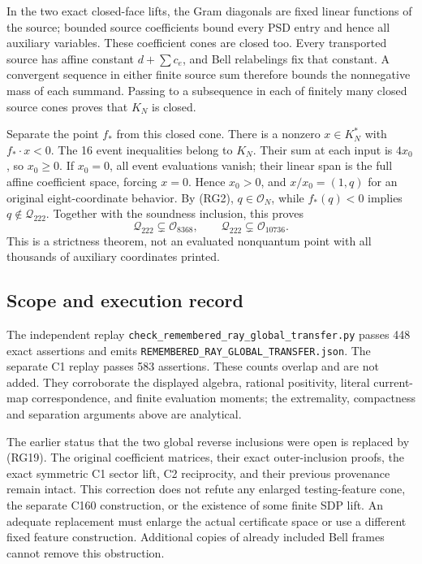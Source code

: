 In the two exact closed-face lifts, the Gram diagonals are fixed
linear functions of the source; bounded source coefficients bound
every PSD entry and hence all auxiliary variables.  These coefficient
cones are closed too.  Every transported source has affine constant
$d+\sum c_e$, and Bell relabelings fix that constant.  A convergent
sequence in either finite source sum therefore bounds the nonnegative
mass of each summand.  Passing to a subsequence in each of finitely
many closed source cones proves that $K_N$ is closed.

Separate the point $f_*$ from this closed cone.  There is a nonzero
$x\in K_N^*$ with $f_*\cdot x<0$.  The 16 event inequalities belong
to $K_N$.  Their sum at each input is $4x_0$, so $x_0\geq0$.
If $x_0=0$, all event evaluations vanish; their linear span is the
full affine coefficient space, forcing $x=0$.  Hence $x_0>0$, and
$x/x_0=(1,q)$ for an original eight-coordinate behavior.  By (RG2),
$q\in\mathcal O_N$, while $f_*(q)<0$ implies $q\notin\mathcal Q_{222}$.
Together with the soundness inclusion, this proves
\[
 \boxed{\mathcal Q_{222}\subsetneq\mathcal O_{8368},\qquad
        \mathcal Q_{222}\subsetneq\mathcal O_{10736}.}             \tag{RG19}
\]
This is a strictness theorem, not an evaluated nonquantum point with
all thousands of auxiliary coordinates printed.

\subsection{Scope and execution record}

The independent replay
\nolinkurl{check_remembered_ray_global_transfer.py} passes 448 exact
assertions and emits
\nolinkurl{REMEMBERED_RAY_GLOBAL_TRANSFER.json}.  The separate C1
replay passes 583 assertions.  These counts overlap and are not added.
They corroborate the displayed algebra, rational positivity, literal
current-map correspondence, and finite evaluation moments; the
extremality, compactness and separation arguments above are analytical.

The earlier status that the two global reverse inclusions were open is
replaced by (RG19).  The original coefficient matrices, their exact
outer-inclusion proofs, the exact symmetric C1 sector lift, C2
reciprocity, and their previous provenance remain intact.  This
correction does not refute any enlarged testing-feature cone, the
separate C160 construction, or the existence of some finite SDP lift.
An adequate replacement must enlarge the actual certificate space or
use a different fixed feature construction.  Additional copies of
already included Bell frames cannot remove this obstruction.
